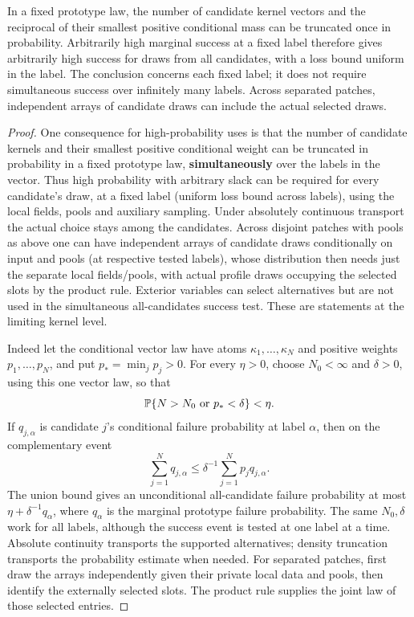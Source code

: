 \begin{corollary}\label{kern:candidate-draws}
In a fixed prototype law, the number of candidate kernel vectors and the reciprocal of their
smallest positive conditional mass can be truncated once in probability. Arbitrarily high
marginal success at a fixed label therefore gives arbitrarily high success for draws from all
candidates, with a loss bound uniform in the label. The conclusion concerns each fixed label;
it does not require simultaneous success over infinitely many labels. Across separated patches,
independent arrays of candidate draws can include the actual selected draws.
\end{corollary}
\begin{proof}

One consequence for high-probability uses is that the number of candidate kernels and their smallest
positive conditional weight can be truncated in probability in a fixed prototype law,
\textbf{simultaneously} over the labels in the vector. Thus high probability with arbitrary slack can be
required for every candidate's draw, at a fixed label (uniform loss bound across labels), using the local
fields, pools and auxiliary sampling. Under absolutely continuous transport the actual choice stays among
the candidates. Across disjoint patches with pools as above one can have independent arrays of candidate
draws conditionally on input and pools (at respective tested labels), whose distribution then needs just the
separate local fields/pools, with actual profile draws occupying the selected slots by the product rule.
Exterior variables can select alternatives but are not used in the simultaneous all-candidates success test.
These are statements at the limiting kernel level.

Indeed let the conditional vector law have atoms \(\kappa_1,\ldots,\kappa_N\) and positive
weights \(p_1,\ldots,p_N\), and put \(p_* =\min_j p_j>0\). For every \(\eta>0\), choose
\(N_0<\infty\) and \(\delta>0\), using this one vector law, so that
\[
 \mathbb P\{N>N_0\text{ or }p_*<\delta\}<\eta.
\]
If \(q_{j,\alpha}\) is candidate \(j\)'s conditional failure probability at label \(\alpha\),
then on the complementary event
\[
 \sum_{j=1}^{N}q_{j,\alpha}
 \le \delta^{-1}\sum_{j=1}^{N}p_jq_{j,\alpha}.
\]
The union bound gives an unconditional all-candidate failure probability at most
\(\eta+\delta^{-1}q_\alpha\), where \(q_\alpha\) is the marginal prototype failure
probability. The same \(N_0,\delta\) work for all labels, although the success event is tested
at one label at a time. Absolute continuity transports the supported alternatives; density
truncation transports the probability estimate when needed. For separated patches, first draw
the arrays independently given their private local data and pools, then identify the externally
selected slots. The product rule supplies the joint law of those selected entries.

\end{proof}

